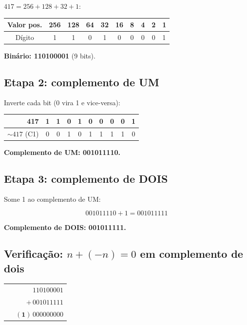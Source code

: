 \documentclass[11pt,a4paper]{article}
\begin{document}
$417 = 256 + 128 + 32 + 1$:

\begin{center}
\renewcommand{\arraystretch}{1.2}
\begin{tabular}{|c|c|c|c|c|c|c|c|c|}
\hline
Valor pos. & 256 & 128 & 64 & 32 & 16 & 8 & 4 & 2 & 1 \\
\hline
D\'igito    & 1   & 1   & 0  & 1  & 0  & 0 & 0 & 0 & 1 \\
\hline
\end{tabular}
\end{center}

\begin{resposta}\textbf{Bin\'ario: 110100001} (9 bits).\end{resposta}

\subsection*{Etapa 2: complemento de UM}

Inverte cada bit (0 vira 1 e vice-versa):

\begin{center}
\begin{tabular}{r|ccccccccc}
417            & 1 & 1 & 0 & 1 & 0 & 0 & 0 & 0 & 1 \\
\hline
$\sim 417$ (C1)& 0 & 0 & 1 & 0 & 1 & 1 & 1 & 1 & 0
\end{tabular}
\end{center}

\begin{resposta}\textbf{Complemento de UM: 001011110.}\end{resposta}

\subsection*{Etapa 3: complemento de DOIS}

Some 1 ao complemento de UM:

\[
001011110 + 1 = 001011111
\]

\begin{resposta}\textbf{Complemento de DOIS: 001011111.}\end{resposta}

\subsection*{Verifica\c{c}\~ao: $n + (-n) = 0$ em complemento de dois}

\begin{center}
\begin{tabular}{r}
$\phantom{+}110100001$ \\
$+ \, 001011111$ \\
\hline
$\phantom{+}\mathbf{(1)}\,000000000$
\end{tabular}
\end{center}
\end{document}
